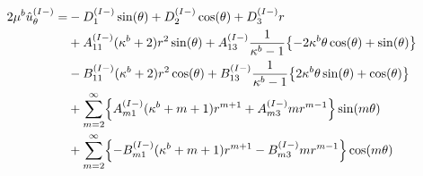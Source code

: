 \begin{align}
2\mu^{b}\hat{u}_{\theta}^{(I-)} =&-D_{1}^{(I-)}\sin(\theta)+D_{2}^{(I-)}\cos(\theta)+D_{3}^{(I-)}r
\nonumber
\\
&+A_{11}^{(I-)}(\kappa^{b}+2)r^2\sin(\theta)
+A_{13}^{(I-)}\frac{1}{\kappa^{b}-1}\bigl\{ -2\kappa^{b}\theta\cos(\theta) +\sin(\theta) \bigr\}
\nonumber
\\
&-B_{11}^{(I-)}(\kappa^{b}+2)r^2\cos(\theta)
+B_{13}^{(I-)}\frac{1}{\kappa^{b}-1}\bigl\{ 2\kappa^{b}\theta\sin(\theta) +\cos(\theta) \bigr\}
\nonumber
\\
&+\sum_{m=2}^{\infty}\Bigl\{A_{m1}^{(I-)}(\kappa^{b}+m+1)r^{m+1}
+A_{m3}^{(I-)}mr^{m-1}\Bigr\}\sin(m\theta)
\nonumber
\\
&+\sum_{m=2}^{\infty}\Bigl\{-B_{m1}^{(I-)}(\kappa^{b}+m+1)r^{m+1}
-B_{m3}^{(I-)}mr^{m-1}\Bigr\}\cos(m\theta)
\label{eq:UThIn1}
\end{align}

\newpage
